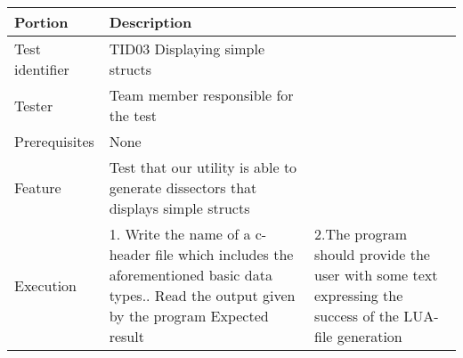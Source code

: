 \documentclass[a4paper, 11pt]{report}
\begin{document}
\begin{table}[H]
\begin{tabularx}{\textwidth}{l X}
\hline\hline
Portion & Description\\[0.5ex]
\hline
Test identifier & TID03 Displaying simple structs\\[0.5ex]
Tester & Team member responsible for the test\\[0.5ex]
Prerequisites & None\\[0.5ex]
Feature & Test that our utility is able to generate dissectors that displays simple structs \\
Execution & 1. Write the name of a c-header file which includes the aforementioned basic data types.. Read the output given by the program 
Expected result & 2.The program should provide the user with some text expressing the success of the LUA-file generation\\[0.5ex]
\hline\hline
\end{tabularx}


\end{table}
\end{document}
